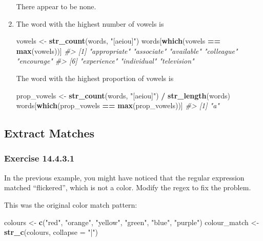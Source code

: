 \documentclass[]{book}
\newenvironment{Shaded}{\begin{snugshade}}{\end{snugshade}}
\newcommand{\CommentTok}[1]{\textcolor[rgb]{0.56,0.35,0.01}{\textit{#1}}}
\newcommand{\DataTypeTok}[1]{\textcolor[rgb]{0.13,0.29,0.53}{#1}}
\newcommand{\KeywordTok}[1]{\textcolor[rgb]{0.13,0.29,0.53}{\textbf{#1}}}
\newcommand{\NormalTok}[1]{#1}
\newcommand{\OperatorTok}[1]{\textcolor[rgb]{0.81,0.36,0.00}{\textbf{#1}}}
\newcommand{\StringTok}[1]{\textcolor[rgb]{0.31,0.60,0.02}{#1}}
\theoremstyle{plain}
\theoremstyle{remark}
\begin{document}
\begin{enumerate}
  There appear to be none.
\item
  The word with the highest number of vowels is

\begin{Shaded}
\begin{Highlighting}[]
\NormalTok{vowels <-}\StringTok{ }\KeywordTok{str_count}\NormalTok{(words, }\StringTok{"[aeiou]"}\NormalTok{)}
\NormalTok{words[}\KeywordTok{which}\NormalTok{(vowels }\OperatorTok{==}\StringTok{ }\KeywordTok{max}\NormalTok{(vowels))]}
\CommentTok{#> [1] "appropriate" "associate"   "available"   "colleague"   "encourage"  }
\CommentTok{#> [6] "experience"  "individual"  "television"}
\end{Highlighting}
\end{Shaded}

  The word with the highest proportion of vowels is

\begin{Shaded}
\begin{Highlighting}[]
\NormalTok{prop_vowels <-}\StringTok{ }\KeywordTok{str_count}\NormalTok{(words, }\StringTok{"[aeiou]"}\NormalTok{) }\OperatorTok{/}\StringTok{ }\KeywordTok{str_length}\NormalTok{(words)}
\NormalTok{words[}\KeywordTok{which}\NormalTok{(prop_vowels }\OperatorTok{==}\StringTok{ }\KeywordTok{max}\NormalTok{(prop_vowels))]}
\CommentTok{#> [1] "a"}
\end{Highlighting}
\end{Shaded}
\end{enumerate}

\hypertarget{extract-matches}{%
\subsection{Extract Matches}\label{extract-matches}}

\hypertarget{exercise-14.4.3.1}{%
\subsubsection*{\texorpdfstring{Exercise
{14.4.3.1}}{Exercise 14.4.3.1}}\label{exercise-14.4.3.1}}

In the previous example, you might have noticed that the regular
expression matched ``flickered'', which is not a color. Modify the regex
to fix the problem.

This was the original color match pattern:

\begin{Shaded}
\begin{Highlighting}[]
\NormalTok{colours <-}\StringTok{ }\KeywordTok{c}\NormalTok{(}\StringTok{"red"}\NormalTok{, }\StringTok{"orange"}\NormalTok{, }\StringTok{"yellow"}\NormalTok{, }\StringTok{"green"}\NormalTok{, }\StringTok{"blue"}\NormalTok{, }\StringTok{"purple"}\NormalTok{)}
\NormalTok{colour_match <-}\StringTok{ }\KeywordTok{str_c}\NormalTok{(colours, }\DataTypeTok{collapse =} \StringTok{"|"}\NormalTok{)}
\end{Highlighting}
\end{Shaded}
\end{document}
